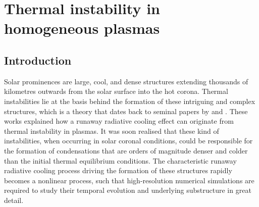 \chapter{Thermal instability in homogeneous plasmas} \label{ch: thermal instability}

\graphicspath{{03-thermal_instability/figures/}}


\section{Introduction}
Solar prominences are large, cool, and dense structures extending thousands of kilometres outwards from the solar surface into the hot corona. Thermal instabilities lie at the basis behind the formation of these intriguing and complex structures, which is a theory that dates back to seminal papers by \citet{parker1953} and \citet{field1965}. These works explained how a runaway radiative cooling effect can originate from thermal instability in plasmas. It was soon realised \citep{priest1979} that these kind of instabilities, when occurring in solar coronal conditions, could be responsible for the formation of condensations that are orders of magnitude denser and colder than the initial thermal equilibrium conditions. The characteristic runaway radiative cooling process driving the formation of these structures rapidly becomes a nonlinear process, such that high-resolution numerical simulations are required to study their temporal evolution and underlying substructure in great detail.

